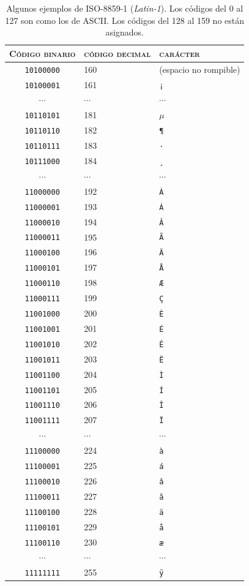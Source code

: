 \begin{table} \begin{center} \begin{tabular}{c|l|l} \hline\hline \textsc{Código binario} &\textsc{código decimal} &\textsc{carácter} \\ \hline

\texttt{10100000} &160 &(espacio no rompible) \\ \texttt{10100001} &161 &\texttt{¡} \\ $\cdots$ &$\cdots$ &$\cdots$ \\ \texttt{10110101} &181 &$\mathtt{\mu}$ \\ \texttt{10110110} &182 &\texttt{¶} \\ \texttt{10110111} &183 &\texttt{·} \\ \texttt{10111000} &184 &\texttt{¸} \\ $\cdots$ &$\cdots$ &$\cdots$ \\ \texttt{11000000} &192 &\texttt{À} \\ \texttt{11000001} &193 &\texttt{Á} \\ \texttt{11000010} &194 &\texttt{Â} \\ \texttt{11000011} &195 &\texttt{Ã} \\ \texttt{11000100} &196 &\texttt{Ä} \\ \texttt{11000101} &197 &\texttt{Å} \\ \texttt{11000110} &198 &\texttt{Æ} \\ \texttt{11000111} &199 &\texttt{Ç} \\ \texttt{11001000} &200 &\texttt{È} \\ \texttt{11001001} &201 &\texttt{É} \\ \texttt{11001010} &202 &\texttt{Ê} \\ \texttt{11001011} &203 &\texttt{Ë} \\ \texttt{11001100} &204 &\texttt{Ì} \\ \texttt{11001101} &205 &\texttt{Í} \\ \texttt{11001110} &206 &\texttt{Î} \\ \texttt{11001111} &207 &\texttt{Ï} \\ $\cdots$ &$\cdots$ &$\cdots$ \\ \texttt{11100000} &224 &\texttt{à} \\ \texttt{11100001} &225 &\texttt{á} \\ \texttt{11100010} &226 &\texttt{â} \\ \texttt{11100011} &227 &\texttt{ã} \\ \texttt{11100100} &228 &\texttt{ä} \\ \texttt{11100101} &229 &\texttt{å} \\ \texttt{11100110} &230 &\texttt{æ} \\ $\cdots$ &$\cdots$ &$\cdots$ \\ \texttt{11111111} &255 &\texttt{ÿ} \\ \end{tabular} \end{center} \caption{Algunos ejemplos de ISO-8859-1 (\emph{Latin-1}). Los códigos del 0 al 127 son como los de ASCII. Los códigos del 128 al 159 no están asignados.} \label{tb:ISO88591} \end{table} 


